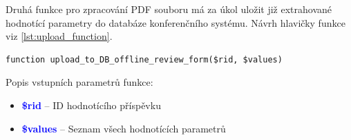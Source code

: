 Druhá funkce pro zpracování PDF souboru má za úkol uložit již extrahované hodnotící parametry do databáze konferenčního systému. Návrh hlavičky funkce viz \ref{lst:upload_function}.

\begin{lstlisting}[caption = {Návrh hlavičky funkce pro uložení dat do databáze}, label = {lst:upload_function}, captionpos=b]
function upload_to_DB_offline_review_form($rid, $values)
\end{lstlisting}
Popis vstupních parametrů funkce:
\begin{itemize}
	\item\textcolor{blue}{\textbf{\$rid}} -- ID hodnotícího příspěvku
	\item\textcolor{blue}{\textbf{\$values}} -- Seznam všech hodnotících parametrů 
\end{itemize}